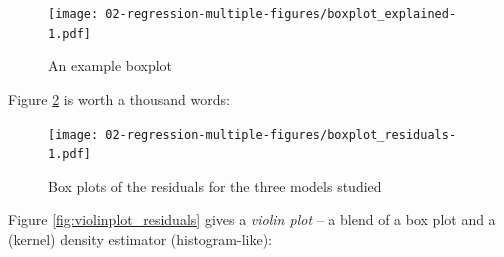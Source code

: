 \documentclass[10pt,b5paper,krantz1]{krantz}
\newenvironment{Shaded}{\begin{snugshade}}{\end{snugshade}}
\newcommand{\DataTypeTok}[1]{\textcolor[rgb]{0.27,0.27,0.27}{#1}}
\newcommand{\DecValTok}[1]{\textcolor[rgb]{0.06,0.06,0.06}{#1}}
\newcommand{\KeywordTok}[1]{\textcolor[rgb]{0.27,0.27,0.27}{\textbf{#1}}}
\newcommand{\NormalTok}[1]{#1}
\newcommand{\OperatorTok}[1]{\textcolor[rgb]{0.43,0.43,0.43}{\textbf{#1}}}
\newcommand{\OtherTok}[1]{\textcolor[rgb]{0.37,0.37,0.37}{#1}}
\newcommand{\StringTok}[1]{\textcolor[rgb]{0.5,0.5,0.5}{#1}}
\begin{document}
\begin{figure}
\hypertarget{fig:boxplot_explained}{%
\centering
\texttt{[image: 02-regression-multiple-figures/boxplot\_explained-1.pdf]}
\caption{An example boxplot}\label{fig:boxplot_explained}
}
\end{figure}

Figure \ref{fig:boxplot_residuals} is worth a thousand words:

\begin{Shaded}
\end{Shaded}

\begin{figure}
\hypertarget{fig:boxplot_residuals}{%
\centering
\texttt{[image: 02-regression-multiple-figures/boxplot\_residuals-1.pdf]}
\caption{Box plots of the residuals for the three models studied}\label{fig:boxplot_residuals}
}
\end{figure}

Figure \ref{fig:violinplot_residuals} gives a \emph{violin plot} -- a blend of a box plot and a (kernel) density estimator (histogram-like):

\begin{Shaded}
\end{Shaded}
\end{document}
